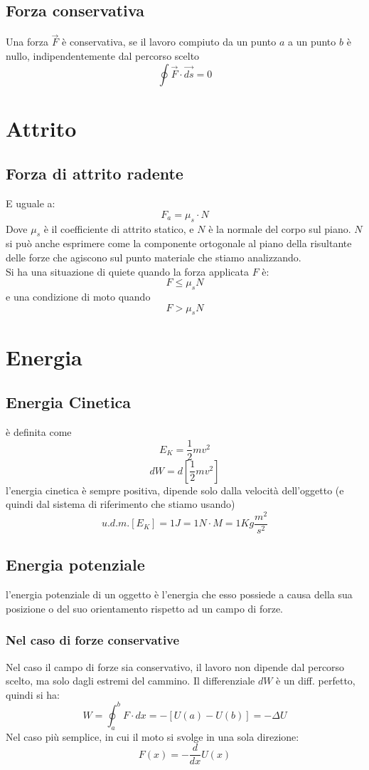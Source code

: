 \documentclass[a4paper]{report}
\begin{document}
  \subsection{Forza conservativa}
  Una forza $\vec{F}$ è conservativa, se il lavoro compiuto da un punto $a$ a un punto $b$ è nullo, indipendentemente dal percorso scelto
  \[ \oint \vec{F} \cdot \vec{ds} = 0 \]

  \section{Attrito}
  \subsection{Forza di attrito radente}
  E uguale a:
  \[ F_a = \mu_s \cdot N\]
  Dove $\mu_s$ è il coefficiente di attrito statico, e $N$ è la normale del corpo sul piano. $N$ si può anche esprimere come la componente ortogonale al piano della risultante delle forze che agiscono sul punto materiale che stiamo analizzando.
  \\Si ha una situazione di quiete quando la forza applicata $F$ è:
  \[ F \leq \mu_s N \]
  e una condizione di moto quando
  \[ F > \mu_s N \]

  \section{Energia}
  \subsection{Energia Cinetica}
  è definita come
  \[ E_K = \frac{1}{2}m v^2 \]
  \[ dW = d[\frac{1}{2}m v^2] \]
  l'energia cinetica è sempre positiva, dipende solo dalla velocità dell'oggetto (e quindi dal sistema di riferimento che stiamo usando)
  \[ u.d.m.[E_K]= 1J = 1N\cdot M = 1 Kg \frac{m^2}{s^2}\]

  \subsection{Energia potenziale}
   l'energia potenziale di un oggetto è l'energia che esso possiede a causa della sua posizione o del suo orientamento rispetto ad un campo di forze.
  \subsubsection{Nel caso di forze conservative}
  Nel caso il campo di forze sia conservativo, il lavoro non dipende dal percorso scelto, ma solo dagli estremi del cammino. Il differenziale $dW$ è un diff. perfetto, quindi si ha:
  \[W = \oint_a^b F \cdot dx = -[U(a) - U(b)] = -\Delta U\]
  Nel caso più semplice, in cui il moto si svolge in una sola direzione:
  \[ F(x) = -\frac{d}{dx}U(x) \]
\end{document}
